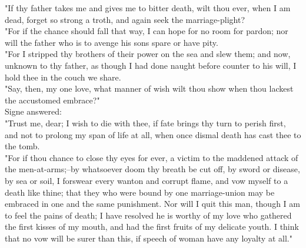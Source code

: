 \documentclass[10pt,a4paper]{report}
\begin{document}
"If thy father takes me and gives me to bitter death, wilt thou ever, when I am dead, forget so strong a troth, and again seek the marriage-plight?\\

"For if the chance should fall that way, I can hope for no room for pardon; nor will the father who is to avenge his sons spare or have pity.\\

"For I stripped thy brothers of their power on the sea and slew them; and now, unknown to thy father, as though I had done naught before counter to his will, I hold thee in the couch we share.\\

"Say, then, my one love, what manner of wish wilt thou show when thou lackest the accustomed embrace?"\\

Signe answered:\\

"Trust me, dear; I wish to die with thee, if fate brings thy turn to perish first, and not to prolong my span of life at all, when once dismal death has cast thee to the tomb.\\

"For if thou chance to close thy eyes for ever, a victim to the maddened attack of the men-at-arms;--by whatsoever doom thy breath be cut off, by sword or disease, by sea or soil, I forswear every wanton and corrupt flame, and vow myself to a death like thine; that they who were bound by one marriage-union may be embraced in one and the same punishment. Nor will I quit this man, though I am to feel the pains of death; I have resolved he is worthy of my love who gathered the first kisses of my mouth, and had the first fruits of my delicate youth. I think that no vow will be surer than this, if speech of woman have any loyalty at all."\\
\end{document}
